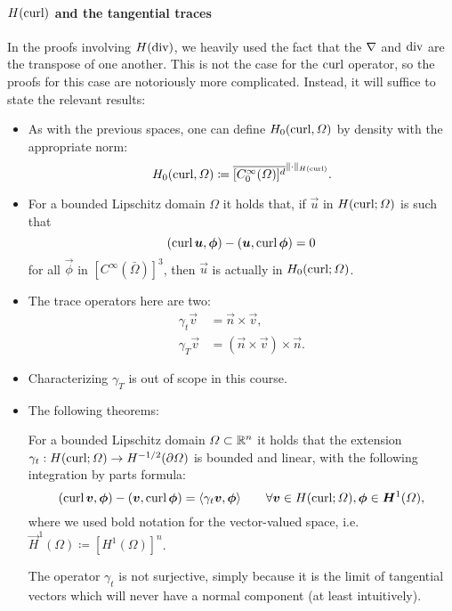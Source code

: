 \paragraph{$H(\operatorname{\text{curl}})$ and the tangential traces} In the proofs involving $H(\operatorname{\text{div}})$, we heavily used the fact that the $\operatorname{\nabla}$ and $\operatorname{\text{div}}$ are the transpose of one another. This is not the case for the $\operatorname{\text{curl}}$ operator, so the proofs for this case are notoriously more complicated. Instead, it will suffice to state the relevant results:
\begin{itemize}
\item As with the previous spaces, one can define $H_0(\operatorname{\text{curl}},\Omega)$ by density with the appropriate norm:
\begin{equation}\label{eq:def-Hcurl-density}
H_0(\operatorname{\text{curl}}, \Omega) \coloneqq \overline{[C_0^\infty(\Omega)]^d}^{\|\cdot\|_{H(\operatorname{\text{curl}})}}.
\end{equation}
\item For a bounded Lipschitz domain $\Omega$ it holds that, if $\vec u$ in $H(\operatorname{\text{curl}};\Omega)$ is such that
\begin{equation*}
(\curl \vec u, \vec \phi) - ( \vec u, \curl \vec \phi) = 0
\end{equation*}
for all $\vec \phi$ in $[C^\infty(\bar\Omega)]^3$, then $\vec u$ is actually in $H_0(\operatorname{\text{curl}};\Omega)$.
\item The trace operators here are two: 
\begin{align*}
\gamma_t \vec v &= \vec n \times \vec v, \\
\gamma_T \vec v &= (\vec n \times \vec v) \times \vec n. 
\end{align*}
\item Characterizing $\gamma_T$ is out of scope in this course. 
\item  The following theorems:
\begin{theorem}\label{thm:curl-identity-H0}
For a bounded Lipschitz domain $\Omega\subset\mathbb{R}^n$ it holds that the extension $\gamma_t: H(\operatorname{\text{curl}};\Omega) \to H^{-1/2}(\partial\Omega)$ is bounded and linear, with the following integration by parts formula: 
\begin{equation*}
(\curl \vec v, \vec\phi) - (\vec v, \curl\vec \phi) = \langle \gamma_t \vec v, \vec \phi\rangle \qquad\forall \vec v \in H(\curl;\Omega), \vec\phi \in \vec H^1(\Omega),
\end{equation*}
where we used bold notation for the vector-valued space, i.e. $\vec H^1(\Omega) \coloneqq [H^1(\Omega)]^n$.
\end{theorem}
The operator $\gamma_t$ is not surjective, simply because it is the limit of tangential vectors which will never have a normal component (at least intuitively). 

\end{itemize}

